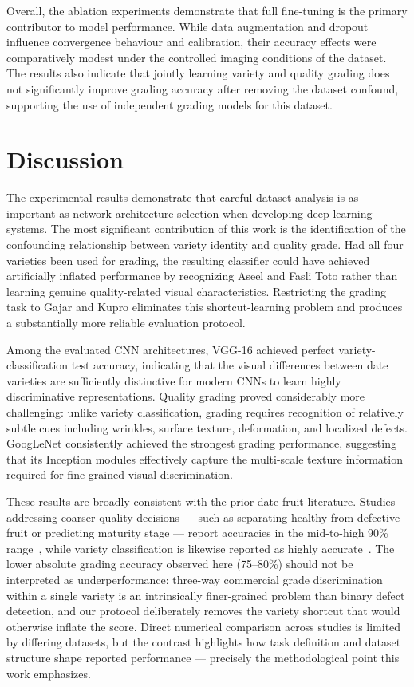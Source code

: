 \documentclass[conference]{IEEEtran}
\begin{document}
Overall, the ablation experiments demonstrate that full fine-tuning is the primary contributor to model performance. While data augmentation and dropout influence convergence behaviour and calibration, their accuracy effects were comparatively modest under the controlled imaging conditions of the dataset. The results also indicate that jointly learning variety and quality grading does not significantly improve grading accuracy after removing the dataset confound, supporting the use of independent grading models for this dataset.

\section{Discussion}
The experimental results demonstrate that careful dataset analysis is as important as network architecture selection when developing deep learning systems. The most significant contribution of this work is the identification of the confounding relationship between variety identity and quality grade. Had all four varieties been used for grading, the resulting classifier could have achieved artificially inflated performance by recognizing Aseel and Fasli Toto rather than learning genuine quality-related visual characteristics. Restricting the grading task to Gajar and Kupro eliminates this shortcut-learning problem and produces a substantially more reliable evaluation protocol.

Among the evaluated CNN architectures, VGG-16 achieved perfect variety-classification test accuracy, indicating that the visual differences between date varieties are sufficiently distinctive for modern CNNs to learn highly discriminative representations. Quality grading proved considerably more challenging: unlike variety classification, grading requires recognition of relatively subtle cues including wrinkles, surface texture, deformation, and localized defects. GoogLeNet consistently achieved the strongest grading performance, suggesting that its Inception modules effectively capture the multi-scale texture information required for fine-grained visual discrimination.

These results are broadly consistent with the prior date fruit literature. Studies addressing coarser quality decisions --- such as separating healthy from defective fruit or predicting maturity stage --- report accuracies in the mid-to-high 90\% range~\cite{nasiri2019sorting,faisal2020ihds}, while variety classification is likewise reported as highly accurate~\cite{albarrak2022model,alhamdan2021controlled}. The lower absolute grading accuracy observed here (75--80\%) should not be interpreted as underperformance: three-way commercial grade discrimination within a single variety is an intrinsically finer-grained problem than binary defect detection, and our protocol deliberately removes the variety shortcut that would otherwise inflate the score. Direct numerical comparison across studies is limited by differing datasets, but the contrast highlights how task definition and dataset structure shape reported performance --- precisely the methodological point this work emphasizes.
\end{document}
